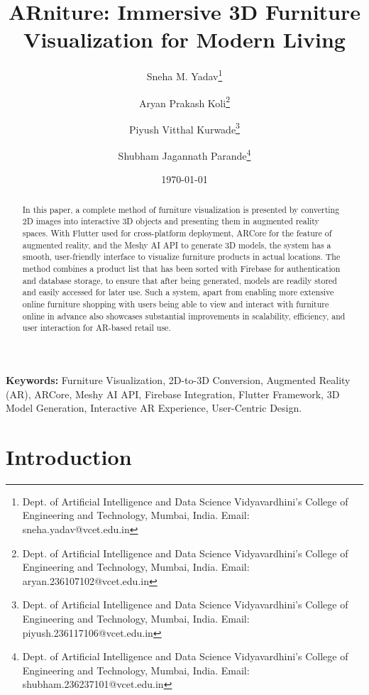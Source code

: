 \documentclass[12pt, a4paper]{article}
\title{ARniture: Immersive 3D Furniture Visualization for Modern Living}
\author{Sneha M. Yadav\thanks{Dept. of Artificial Intelligence and Data Science Vidyavardhini's College of Engineering and Technology, Mumbai, India. Email: sneha.yadav@vcet.edu.in} \and Aryan Prakash Koli\thanks{Dept. of Artificial Intelligence and Data Science Vidyavardhini's College of Engineering and Technology, Mumbai, India. Email: aryan.236107102@vcet.edu.in} \and Piyush Vitthal Kurwade\thanks{Dept. of Artificial Intelligence and Data Science Vidyavardhini's College of Engineering and Technology, Mumbai, India. Email: piyush.236117106@vcet.edu.in} \and Shubham Jagannath Parande\thanks{Dept. of Artificial Intelligence and Data Science Vidyavardhini's College of Engineering and Technology, Mumbai, India. Email: shubham.236237101@vcet.edu.in}}
\date{\today}
\begin{document}
\maketitle

\begin{abstract}
In this paper, a complete method of furniture visualization is presented by converting 2D images into interactive 3D objects and presenting them in augmented reality spaces. With Flutter used for cross-platform deployment, ARCore for the feature of augmented reality, and the Meshy AI API to generate 3D models, the system has a smooth, user-friendly interface to visualize furniture products in actual locations. The method combines a product list that has been sorted with Firebase for authentication and database storage, to ensure that after being generated, models are readily stored and easily accessed for later use. Such a system, apart from enabling more extensive online furniture shopping with users being able to view and interact with furniture online in advance also showcases substantial improvements in scalability, efficiency, and user interaction for AR-based retail use.
\end{abstract}

\noindent\textbf{Keywords:} Furniture Visualization, 2D-to-3D Conversion, Augmented Reality (AR), ARCore, Meshy AI API, Firebase Integration, Flutter Framework, 3D Model Generation, Interactive AR Experience, User-Centric Design.

\section{Introduction}
\end{document}
